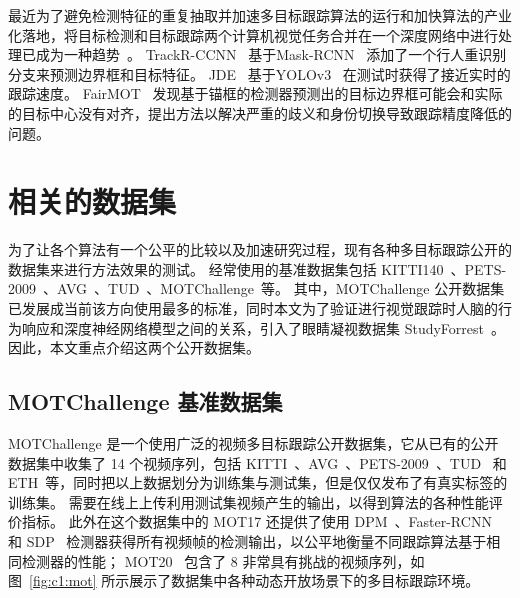 最近为了避免检测特征的重复抽取并加速多目标跟踪算法的运行和加快算法的产业化落地，将目标检测和目标跟踪两个计算机视觉任务合并在一个深度网络中进行处理已成为一种趋势~\cite{jde,voigtlaender2019mots,fairmot}。
TrackR-CCNN~\cite{voigtlaender2019mots} 基于Mask-RCNN~\cite{he2017mask} 添加了一个行人重识别分支来预测边界框和目标特征。
JDE~\cite{jde} 基于YOLOv3~\cite{redmon2018yolov3} 在测试时获得了接近实时的跟踪速度。
FairMOT~\cite{fairmot} 发现基于锚框的检测器预测出的目标边界框可能会和实际的目标中心没有对齐，提出方法以解决严重的歧义和身份切换导致跟踪精度降低的问题。


\section{相关的数据集}
为了让各个算法有一个公平的比较以及加速研究过程，现有各种多目标跟踪公开的数据集来进行方法效果的测试。
经常使用的基准数据集包括 KITTI140~\cite{autonomous_vechicle}、PETS-2009~\cite{ferryman2009pets2009}、AVG~\cite{benfold2009guiding}、TUD~\cite{andriluka2010monocular}、MOTChallenge~\cite{leal2015motchallenge,mot16}等。
其中，MOTChallenge 公开数据集已发展成当前该方向使用最多的标准，同时本文为了验证进行视觉跟踪时人脑的行为响应和深度神经网络模型之间的关系，引入了眼睛凝视数据集 StudyForrest~\cite{gaze_forrest}。
因此，本文重点介绍这两个公开数据集。


\subsection{MOTChallenge 基准数据集}
MOTChallenge 是一个使用广泛的视频多目标跟踪公开数据集，它从已有的公开数据集中收集了 14 个视频序列，包括 KITTI~\cite{autonomous_vechicle}、AVG~\cite{benfold2009guiding}、PETS-2009~\cite{ferryman2009pets2009}、TUD~\cite{andriluka2010monocular} 和 ETH~\cite{ess2007depth}等，同时把以上数据划分为训练集与测试集，但是仅仅发布了有真实标签的训练集。
需要在线上上传利用测试集视频产生的输出，以得到算法的各种性能评价指标。
此外在这个数据集中的 MOT17 还提供了使用 DPM~\cite{felzenszwalb2009object}、Faster-RCNN~\cite{b8} 和 SDP~\cite{sdp} 检测器获得所有视频帧的检测输出，以公平地衡量不同跟踪算法基于相同检测器的性能；
MOT20~\cite{dendorfer2020mot20} 包含了 8 非常具有挑战的视频序列，如图~\ref{fig:c1:mot} 所示展示了数据集中各种动态开放场景下的多目标跟踪环境。

